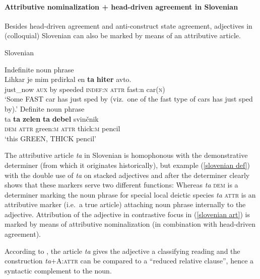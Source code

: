 \paragraph*{Attributive nominalization + head\hyp{}driven agreement in Slovenian}
Besides head\hyp{}driven agreement and anti\hyp{}construct state agreement, adjectives in (colloquial) Slovenian can also be marked by means of an attributive article.
\begin{exe}
\label{slovenian art}
\ex \rm{Slovenian \citep{marusic-etal2007}}
\begin{xlist}
\ex \rm{Indefinite noun phrase}\\
\gll	Lihkar je mim prdirkal en \textbf{ta} \textbf{hiter} avto.\\
	just\_now \textsc{aux} by speeded \textsc{indef:n} \textsc{attr} fast:n car(\textsc{n})\\
\glt	‘Some FAST car has just sped by (viz.~one of the fast type of cars has just sped by).’ 
\label{slovenian def}
\ex \rm{Definite noun phrase}\\
\gll 	ta \textbf{ta} \textbf{zelen} \textbf{ta} \textbf{debel} svin\v{c}nik\\
	\textsc{dem} \textsc{attr} green\textsc{:m} \textsc{attr} thick\textsc{:m} pencil\\
\glt 	‘this GREEN, THICK pencil’
\end{xlist}
\end{exe}
The attributive article \textit{ta} in Slovenian is homophonous with the demonstrative determiner (from which it originates historically), but example (\ref{slovenian def}) with the double use of \textit{ta} on stacked adjectives and after the determiner clearly shows that these markers serve two different functions: Whereas \textit{ta} \textsc{dem} is a determiner marking the noun phrase for special local deictic species \textit{ta} \textsc{attr} is an attributive marker (i.e.~a true article) attaching noun phrase internally to the adjective. Attribution of the adjective in contrastive focus in (\ref{slovenian art}) is marked by means of attributive nominalization (in combination with head\hyp{}driven agreement).

According to \cite{marusic-etal2007,marusic-etal2007b}, the article \textit{ta} gives the adjective a classifying reading and the construction \textit{ta}+A:\textsc{attr} can be compared to a “reduced relative clause”, hence a syntactic complement to the noun.


